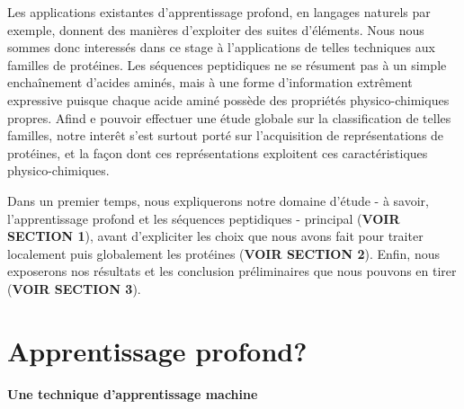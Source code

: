 \documentclass[a4paper, 11pt, onecolumn]{article}
\begin{document}
Les applications existantes d'apprentissage profond, en langages naturels par
exemple, donnent des manières d'exploiter des suites d'éléments.
Nous nous sommes donc interessés dans ce stage à l'applications de telles techniques
aux familles de protéines. Les séquences peptidiques ne se résument pas à un
simple enchaînement d'acides aminés, mais à une forme d'information extrêment
expressive puisque chaque acide aminé possède des propriétés physico-chimiques
propres. Afind e pouvoir effectuer une étude globale sur la classification de
telles familles, notre interêt s'est surtout porté sur l'acquisition de
représentations de protéines, et la façon dont ces représentations exploitent
ces caractéristiques physico-chimiques.

Dans un premier temps, nous expliquerons notre domaine d'étude - à savoir,
l'apprentissage profond et les séquences peptidiques - principal (\textbf{VOIR
  SECTION 1}), avant d'expliciter les choix que nous avons fait pour traiter
localement puis globalement les protéines (\textbf{VOIR SECTION 2}). Enfin, nous
exposerons nos résultats et les conclusion préliminaires que nous pouvons en
tirer (\textbf{VOIR SECTION 3}).


\section{Apprentissage profond?}

\paragraph{Une technique d'apprentissage machine}
\end{document}
